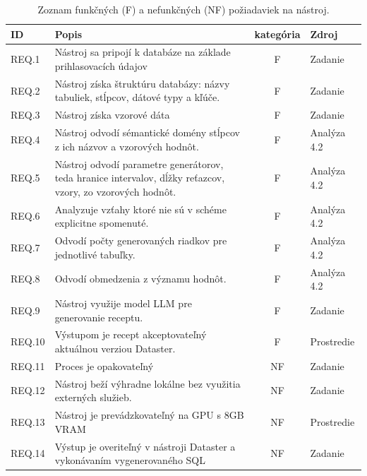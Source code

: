 \begin{table}[h]
    \centering
    \begin{tabularx}{\textwidth}{|l|X|c|l|}
         \toprule
         \textbf{ID} & \textbf{Popis} & \textbf{kategória} & \textbf{Zdroj} \\
         \midrule
        REQ.1   & Nástroj sa pripojí k databáze na základe prihlasovacích údajov & F & Zadanie \\ \hline
        REQ.2   & Nástroj získa štruktúru databázy: názvy tabuliek, stĺpcov, dátové typy a kľúče. & F & Zadanie \\ \hline
        REQ.3   & Nástroj získa vzorové dáta & F & Zadanie \\ \hline
        REQ.4   & Nástroj odvodí sémantické domény stĺpcov z ich názvov a vzorových hodnôt. & F & Analýza 4.2 \\ \hline
        REQ.5   & Nástroj odvodí parametre generátorov, teda hranice intervalov, dĺžky reťazcov, vzory, zo vzorových hodnôt. & F & Analýza 4.2 \\ \hline
        REQ.6   & Analyzuje vzťahy ktoré nie sú v schéme explicitne spomenuté. & F & Analýza 4.2 \\ \hline
        REQ.7   & Odvodí počty  generovaných riadkov pre jednotlivé tabuľky. & F & Analýza 4.2 \\ \hline
        REQ.8   & Odvodí obmedzenia z významu hodnôt. & F & Analýza 4.2 \\ \hline
        REQ.9   & Nástroj využije model LLM pre generovanie receptu. & F & Zadanie \\ \hline
        REQ.10  & Výstupom je recept akceptovateľný aktuálnou verziou Dataster. & F & Prostredie \\ \hline
        REQ.11  & Proces je opakovateľný & NF &Zadanie \\ \hline
        REQ.12  & Nástroj beží výhradne lokálne bez využitia externých služieb. & NF & Zadanie \\  \hline
        REQ.13  & Nástroj je prevádzkovateľný na GPU s 8GB VRAM & NF & Prostredie \\ \hline
        REQ.14  & Výstup je overiteľný v nástroji Dataster a vykonávaním vygenerovaného SQL & NF & Zadanie \\ 

         \bottomrule
    \end{tabularx}
    \caption{Zoznam funkčných (F) a nefunkčných (NF) požiadaviek na nástroj.}
    \label{tab:reqs}
\end{table}